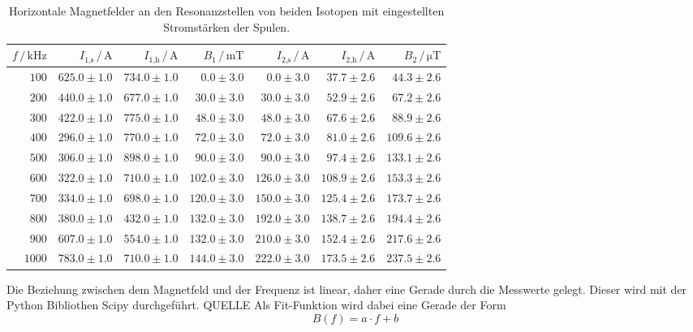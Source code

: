 \begin{table}
    \centering
    \caption{Horizontale Magnetfelder an den Resonanzstellen von beiden Isotopen mit eingestellten Stromstärken der Spulen.}
    \label{tab:f}
    \begin{tabular}{r r r r r r r}
        \toprule
        $f \,/\, \unit{\kilo\hertz}$ & $I_\text{1,s} \,/\, \unit{\ampere}$ & $I_\text{1,h} \,/\, \unit{\ampere}$ & $B_\text{1} \,/\, \unit{\milli\tesla}$ & $I_\text{2,s} \,/\, \unit{\ampere}$ & $I_\text{2,h} \,/\, \unit{\ampere}$ & $B_\text{2} \,/\, \unit{\micro\tesla}$\\
        \midrule
        $100 $ & $625.0\pm1.0$ & $734.0\pm1.0$ & $0.0\pm3.0$ & $0.0\pm3.0$  & $37.7\pm2.6$ & $44.3\pm2.6$ \\
        $200 $ & $440.0\pm1.0$ & $677.0\pm1.0$ & $30.0\pm3.0$ & $30.0\pm3.0$  & $52.9\pm2.6$ & $67.2\pm2.6$ \\
        $300 $ & $422.0\pm1.0$ & $775.0\pm1.0$ & $48.0\pm3.0$ & $48.0\pm3.0$  & $67.6\pm2.6$ & $88.9\pm2.6$ \\
        $400 $ & $296.0\pm1.0$ & $770.0\pm1.0$ & $72.0\pm3.0$  & $72.0\pm3.0 $ & $81.0\pm2.6$ & $109.6\pm2.6$ \\
        $500 $ & $306.0\pm1.0$ & $898.0\pm1.0$ & $90.0\pm3.0$  & $90.0\pm3.0 $ & $97.4\pm2.6$ & $133.1\pm2.6$ \\
        $600 $ & $322.0\pm1.0$ & $710.0\pm1.0$ & $102.0\pm3.0$ & $126.0\pm3.0$ & $108.9\pm2.6$ & $153.3\pm2.6$ \\
        $700 $ & $334.0\pm1.0$ & $698.0\pm1.0$ & $120.0\pm3.0$ & $150.0\pm3.0$ & $125.4\pm2.6$ & $173.7\pm2.6$ \\
        $800 $ & $380.0\pm1.0$ & $432.0\pm1.0$ & $132.0\pm3.0$ & $192.0\pm3.0$ & $138.7\pm2.6$ & $194.4\pm2.6$ \\
        $900 $ & $607.0\pm1.0$ & $554.0\pm1.0$ & $132.0\pm3.0$ & $210.0\pm3.0$ & $152.4\pm2.6$ & $217.6\pm2.6$ \\
        $1000$ & $783.0\pm1.0$ & $710.0\pm1.0$ & $144.0\pm3.0$ & $222.0\pm3.0$ & $173.5\pm2.6$ & $237.5\pm2.6$ \\
        \bottomrule
    \end{tabular}
\end{table}
Die Beziehung zwischen dem Magnetfeld und der Frequenz ist linear, daher eine Gerade durch die Messwerte gelegt.
Dieser wird mit der Python Bibliothen Scipy durchgeführt. QUELLE
Als Fit-Funktion wird dabei eine Gerade der Form
\begin{equation*}
    B(f) = a \cdot f + b
\end{equation*}
